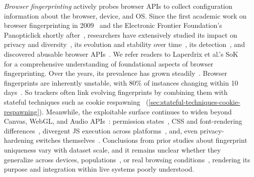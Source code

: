 \textit{Browser fingerprinting} actively probes browser APIs to collect configuration information about the browser, device, and OS.
%
Since the first academic work on browser fingerprinting in 2009~\cite{mayerAnyPersonPamphleteer2009} and the Electronic Frontier Foundation's Panopticlick shortly after~\cite{eckersleyHowUniqueYour2010}, researchers have extensively studied its impact on privacy and diversity~\cite{laperdrixBeautyBeastDiverting2016,gomez-boixHidingCrowdAnalysis2018}, its evolution and stability over time~\cite{vastelFPSTALKERTrackingBrowser2018}, its detection~\cite{suAutomaticDiscoveryEmerging2023,nomoto2023browser}, and discovered abusable browser APIs~\cite{olejnikLeakingBatteryPrivacy2016,dasWebsSixthSense2018,linFashionFauxPas2023,huygheFPRainbowFingerprintBasedBrowser2025}.
%
We refer readers to Laperdrix et al.'s SoK~\cite{laperdrix2020browser} for a comprehensive understanding of foundational aspects of browser fingerprinting.
%
%
Over the years, its prevalence has grown steadily~\cite{nikiforakisCookielessMonsterExploring2013,acarFPDetectiveDustingWeb2013,englehardtOnlineTracking1millionsite2016,iqbalFingerprintingFingerprintersLearning2021}. 
%
%
Browser fingerprints are inherently unstable, with 80\% of instances changing within 10 days~\cite{vastelFPSTALKERTrackingBrowser2018,liWhoTouchedMy2020}. 
%
So trackers often link evolving fingerprints by combining them with stateful techniques such as cookie respawning~\cite{fouadMyCookiePhoenix2022} (\autoref{sec:stateful-techniques-cookie-respawning}). %
%
Meanwhile, the exploitable surface continues to widen beyond Canvas, WebGL, and Audio APIs~\cite{chaliseYourSpeakerMy2022}: permission states~\cite{nomoto2023browser}, CSS and font-rendering differences~\cite{linFashionFauxPas2023}, divergent JS execution across platforms~\cite{zafarSameScriptDifferent2025}, and, even privacy-hardening switches themselves~\cite{huygheFPRainbowFingerprintBasedBrowser2025}.
%
Conclusions from prior studies about fingerprint uniqueness vary with dataset scale, 
and it remains unclear whether they generalize across devices, populations~\cite{berkeHowUniqueWhose2025,pradeepNotYourAverage2023}, or real browsing conditions~\cite{muthu2025beyond,deuserBrowsingUnicityLimits2020}, rendering its purpose and integration within live systems poorly understood.
%

